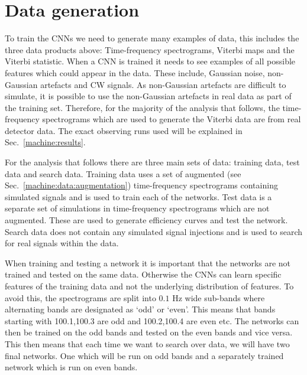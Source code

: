 \section{\label{machine:data} Data generation}

%

To train the \glspl{CNN} we need to generate many examples of data, this includes the three data products above: Time-frequency spectrograms, Viterbi maps and the Viterbi statistic. 
When a \gls{CNN} is trained it needs to see examples of all possible features which could appear in the data. These include, Gaussian noise, non-Gaussian artefacts and \gls{CW} signals. 
As non-Gaussian artefacts are difficult to simulate, it is possible to use the non-Gaussian artefacts in real data as part of the training set.
Therefore, for the majority of the analysis that follows, the time-frequency spectrograms which are used to generate the Viterbi data are from real detector data. The exact observing runs used will be explained in Sec.~\ref{machine:results}. 

For the analysis that follows there are three main sets of data: training data,
test data and search data. 
Training data uses a set of augmented (see Sec.~\ref{machine:data:augmentation}) time-frequency spectrograms containing simulated signals and is used to train each of
the networks. 
Test data is a separate set of simulations in time-frequency spectrograms which are not augmented. These are used to generate
efficiency curves and test the network.
Search data does not contain any simulated signal injections and is used to search for real signals within the data.

%
When training and testing a network it is important that the networks are not
trained and tested on the same data. Otherwise the \glspl{CNN} can learn specific
features of the training data and not the underlying
distribution of features. To avoid this, the spectrograms are split into $0.1$
Hz wide sub-bands where alternating bands are designated as `odd' or `even'.
This means that bands starting with 100.1,100.3 are odd and 100.2,100.4 are
even etc. The networks can then be trained on the odd bands and tested on the
even bands and vice versa.
This then means that each time we want to search over data, we will have two final networks. One which will be run on odd bands and a separately trained network which is run on even bands. 



